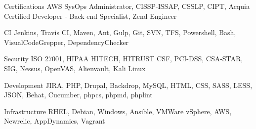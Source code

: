 


\begin{cvskills}


\cvskill
{Certifications}
{AWS SysOps Administrator, CISSP-ISSAP, CSSLP, CIPT, Acquia Certified Developer - Back end Specialist, Zend Engineer }

\cvskill
{CI}
{Jenkins, Travis CI, Maven, Ant, Gulp, Git, SVN, TFS, Powershell, Bash, VisualCodeGrepper, DependencyChecker }

\cvskill
{Security}
{ISO 27001, HIPAA HITECH, HITRUST CSF, PCI-DSS, CSA-STAR, SIG, Nessus, OpenVAS, Alienvault, Kali Linux }

\cvskill
{Development}
{JIRA, PHP, Drupal, Backdrop, MySQL, HTML, CSS, SASS, LESS, JSON, Behat, Cucumber, phpcs, phpmd, phplint }

\cvskill
{Infrastructure}
{RHEL, Debian, Windows, Ansible, VMWare vSphere, AWS, Newrelic, AppDynamics, Vagrant }




\end{cvskills}
